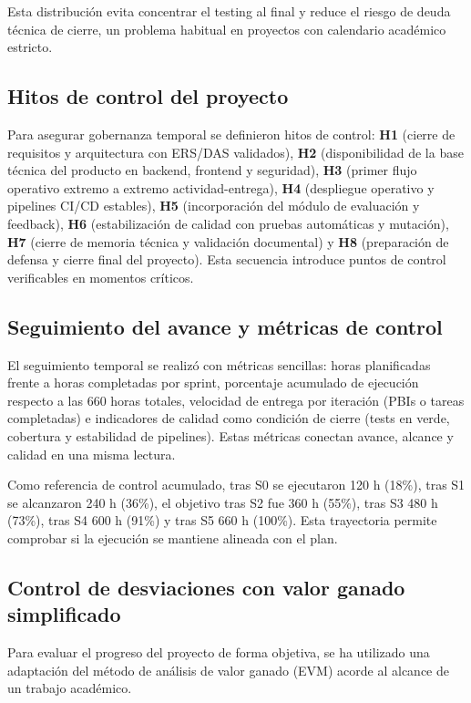 Esta distribuci\'on evita concentrar el testing al final y reduce el riesgo de deuda t\'ecnica
de cierre, un problema habitual en proyectos con calendario acad\'emico estricto.

\subsection{Hitos de control del proyecto}

Para asegurar gobernanza temporal se definieron hitos de control: \textbf{H1} (cierre de requisitos y arquitectura con ERS/DAS validados), \textbf{H2} (disponibilidad de la base t\'ecnica del producto en backend, frontend y seguridad), \textbf{H3} (primer flujo operativo extremo a extremo actividad-entrega), \textbf{H4} (despliegue operativo y pipelines CI/CD estables), \textbf{H5} (incorporaci\'on del m\'odulo de evaluaci\'on y feedback), \textbf{H6} (estabilizaci\'on de calidad con pruebas autom\'aticas y mutaci\'on), \textbf{H7} (cierre de memoria t\'ecnica y validaci\'on documental) y \textbf{H8} (preparaci\'on de defensa y cierre final del proyecto). Esta secuencia introduce puntos de control verificables en momentos cr\'iticos.

\subsection{Seguimiento del avance y m\'etricas de control}

El seguimiento temporal se realiz\'o con m\'etricas sencillas: horas planificadas frente a horas completadas por sprint, porcentaje acumulado de ejecuci\'on respecto a las 660 horas totales, velocidad de entrega por iteraci\'on (PBIs o tareas completadas) e indicadores de calidad como condici\'on de cierre (tests en verde, cobertura y estabilidad de pipelines). Estas m\'etricas conectan avance, alcance y calidad en una misma lectura.

Como referencia de control acumulado, tras S0 se ejecutaron 120 h (18\%), tras S1 se alcanzaron 240 h (36\%), el objetivo tras S2 fue 360 h (55\%), tras S3 480 h (73\%), tras S4 600 h (91\%) y tras S5 660 h (100\%). Esta trayectoria permite comprobar si la ejecuci\'on se mantiene alineada con el plan.

\subsection{Control de desviaciones con valor ganado simplificado}

Para evaluar el progreso del proyecto de forma objetiva,
se ha utilizado una adaptaci\'on del m\'etodo de an\'alisis de valor ganado (EVM)
acorde al alcance de un trabajo acad\'emico.

